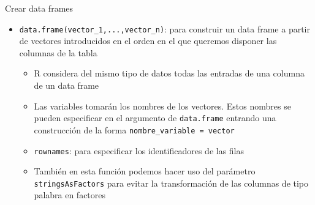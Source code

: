 \documentclass[
  ignorenonframetext,
  aspectratio=169]{beamer}
\providecommand{\tightlist}{%
  \setlength{\itemsep}{0pt}\setlength{\parskip}{0pt}}
\begin{document}
\begin{frame}[fragile]{Crear data frames}
\label{crear-data-frames}
\begin{itemize}
\tightlist
\item
  \texttt{data.frame(vector\_1,...,vector\_n)}: para construir un data
  frame a partir de vectores introducidos en el orden en el que queremos
  disponer las columnas de la tabla

  \begin{itemize}
  \tightlist
  \item
    R considera del mismo tipo de datos todas las entradas de una
    columna de un data frame
  \item
    Las variables tomarán los nombres de los vectores. Estos nombres se
    pueden especificar en el argumento de \texttt{data.frame} entrando
    una construcción de la forma \texttt{nombre\_variable\ =\ vector}
  \item
    \texttt{rownames}: para especificar los identificadores de las filas
  \item
    También en esta función podemos hacer uso del parámetro
    \texttt{stringsAsFactors} para evitar la transformación de las
    columnas de tipo palabra en factores
  \end{itemize}
\end{itemize}
\end{frame}
\end{document}
